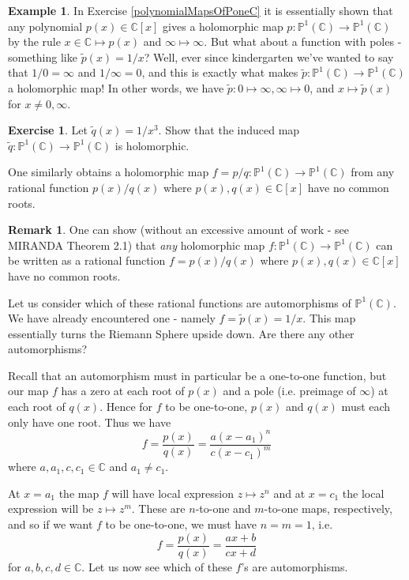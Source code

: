 \documentclass[12pt]{book}%
\theoremstyle{plain}
\theoremstyle{definition}
\newtheorem{example}[theorem]{Example}
\newtheorem{exercise}{Exercise}
\newtheorem{remark}[theorem]{Remark}
\theoremstyle{remark}
\def\to{\rightarrow}
\def\bC{{\mathbb{C}}}
\newcommand{\PoneC}{{\mathbb P}^1({\mathbb C})}
\begin{document}
\begin{example}
In Exercise \ref{polynomialMapsOfPoneC} it is essentially shown that any polynomial $p(x) \in \bC[x]$ gives a holomorphic map $p:\PoneC \to \PoneC$ by the rule $x \in \bC \mapsto p(x)$ and $\infty \mapsto \infty$. But what about a function with poles - something like $\tilde{p}(x) = 1/x$? Well, ever since kindergarten we've wanted to say that $1/0 = \infty$ and $1/\infty = 0$, and this is exactly what makes $\tilde{p}:\PoneC \to \PoneC$ a holomorphic map! In other words, we have $\tilde{p}:0 \mapsto \infty, \infty \mapsto 0$, and $x \mapsto \tilde{p}(x)$ for $x \neq 0, \infty$.

\begin{exercise}
\label{oneOverXCubedExercise}
Let $\tilde{q}(x) = 1/x^3$. Show that the induced map $\tilde{q}:\PoneC \to \PoneC$ is holomorphic.
\end{exercise}

One similarly obtains a holomorphic map $f=p/q:\PoneC \to \PoneC$ from any rational function $p(x)/q(x)$ where $p(x),q(x) \in \bC[x]$ have no common roots.

\begin{remark}
\label{rationalFunctionsAreP1Maps}
One can show (without an excessive amount of work - see MIRANDA Theorem 2.1) that \textit{any} holomorphic map $f:\PoneC \to \PoneC$ can be written as a rational function $f=p(x)/q(x)$ where $p(x),q(x) \in \bC[x]$ have no common roots.
\end{remark}


Let us consider which of these rational functions are automorphisms of $\PoneC$. We have already encountered one - namely $f=\tilde{p}(x)=1/x$. This map essentially turns the Riemann Sphere upside down. Are there any other automorphisms?

Recall that an automorphism must in particular be a one-to-one function, but our map $f$ has a zero at each root of $p(x)$ and a pole (i.e. preimage of $\infty$) at each root of $q(x)$. Hence for $f$ to be one-to-one, $p(x)$ and $q(x)$ must each only have one root. Thus we have
\[
f = \frac{p(x)}{q(x)}=\frac{a(x-a_1)^n}{c(x-c_1)^m}
\]
where $a,a_1,c,c_1 \in \bC$ and $a_1 \neq c_1$.

At $x=a_1$ the map $f$ will have local expression $z \mapsto z^n$ and at $x=c_1$ the local expression will be $z \mapsto z^m$.  These are $n$-to-one and $m$-to-one maps, respectively, and so if we want $f$ to be one-to-one, we must have $n=m=1$, i.e.
\[
f = \frac{p(x)}{q(x)}=\frac{ax+b}{cx+d}
\]
for $a,b,c,d \in \bC$. Let us now see which of these $f$'s are automorphisms.


\end{example}
\end{document}
